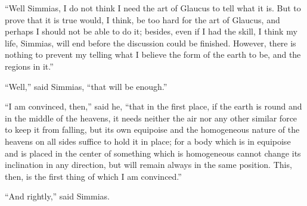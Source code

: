 \documentclass[letterpaper,12pt]{article}
\newcommand{\stephpag}[1]{\marginnote{\small\itshape\fontfamily{ppl}\selectfont #1}}
\begin{document}
\begin{drama}
``Well Simmias, I do not think I need the art of Glaucus to tell what it is. But to prove that it is true would, I think, be too hard for the art of Glaucus, and perhaps I should not be able to do it; besides, even if I had the skill, I think my life, Simmias, will end before the discussion could be finished. However, there is nothing to prevent my telling \stephpag{e} what I believe the form of the earth to be, and the regions in it.''
 
``Well,'' said Simmias, ``that will be enough.''
 
``I am convinced, then,'' said he, ``that in the first place, if the earth is round and in the middle of the heavens, it needs neither the air \stephpag{109 a} nor any other similar force to keep it from falling, but its own equipoise and the homogeneous nature of the heavens on all sides suffice to hold it in place; for a body which is in equipoise and is placed in the center of something which is homogeneous cannot change its inclination in any direction, but will remain always in the same position. This, then, is the first thing of which I am convinced.''
 
``And rightly,'' said Simmias.
 

\end{drama}
\end{document}
